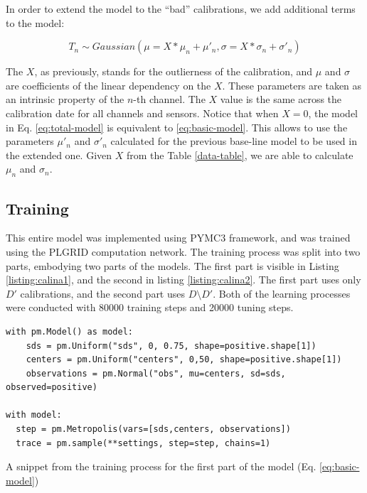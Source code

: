 In order to extend the model to the ``bad'' calibrations, we add additional terms to the model:

\begin{equation}
    \label{eq:total-model}
    T_n \sim Gaussian(\mu=X*\mu_n+\mu\prime_n, \sigma=X*\sigma_n+\sigma\prime_n)
\end{equation}

The $X$, as previously, stands for the outlierness of the calibration, and $\mu$ and $\sigma$ are coefficients of the linear dependency on the $X$.
These parameters are taken as an intrinsic property of the $n$-th channel.
The $X$ value is the same across the calibration date for all channels and sensors.
Notice that when $X=0$, the model in Eq. \ref{eq:total-model} is equivalent to \ref{eq:basic-model}.
This allows to use the parameters $\mu\prime_{n}$ and $\sigma\prime_{n}$ calculated for the previous base-line model to be used in the extended one.
Given $X$ from the Table \ref{data-table}, we are able to calculate $\mu_{n}$ and $\sigma_{n}$.

\subsection{Training}
This entire model was implemented using PYMC3\cite{Salvatier2016} framework, and was trained using the PLGRID computation network.
The training process was split into two parts, embodying two parts of the models.
The first part is visible in Listing \ref{listing:calina1}, and the second in listing \ref{listing:calina2}.
The first part uses only $D\prime$ calibrations, and the second part uses $D \setminus D\prime$.
Both of the learning processes were conducted with 80000 training steps and 20000 tuning steps.

\begin{listing}[H]
\begin{verbatim}
with pm.Model() as model:
    sds = pm.Uniform("sds", 0, 0.75, shape=positive.shape[1])
    centers = pm.Uniform("centers", 0,50, shape=positive.shape[1])
    observations = pm.Normal("obs", mu=centers, sd=sds, observed=positive)

with model:
  step = pm.Metropolis(vars=[sds,centers, observations])
  trace = pm.sample(**settings, step=step, chains=1)
\end{verbatim}
\caption{A snippet from the training process for the first part of the model (Eq. \ref{eq:basic-model})}
\label{listing:calina1}
\end{listing}

